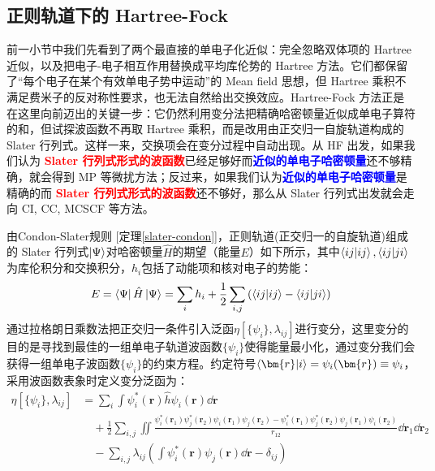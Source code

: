 \subsection{正则轨道下的 Hartree-Fock}\label{sec:hf}
前一小节中我们先看到了两个最直接的单电子化近似：完全忽略双体项的 Hartree 近似，以及把电子-电子相互作用替换成平均库伦势的 Hartree 方法。它们都保留了“每个电子在某个有效单电子势中运动”的 Mean field 思想，但 Hartree 乘积不满足费米子的反对称性要求，也无法自然给出交换效应。Hartree-Fock 方法正是在这里向前迈出的关键一步：它仍然利用变分法把精确哈密顿量近似成单电子算符的和，但试探波函数不再取 Hartree 乘积，而是改用由正交归一自旋轨道构成的 Slater 行列式。这样一来，交换项会在变分过程中自动出现。从 HF 出发，如果我们认为\textcolor{red}{\textbf{ Slater 行列式形式的波函数}}已经足够好而\textcolor{blue}{\textbf{近似的单电子哈密顿量}}还不够精确，就会得到 MP 等微扰方法；反过来，如果我们认为\textcolor{blue}{\textbf{近似的单电子哈密顿量}}是精确的而\textcolor{red}{\textbf{ Slater 行列式形式的波函数}}还不够好，那么从 Slater 行列式出发就会走向 CI, CC, MCSCF 等方法。

由Condon-Slater规则 [定理\ref{slater-condon}]，正则轨道(正交归一的自旋轨道)组成的 Slater 行列式$\ket{\Psi}$对哈密顿量$\hat{H}$的期望（能量$E$）如下所示，其中$\bra{ij}\ket{ij},\bra{ij}\ket{ji}$为库伦积分和交换积分，$h_i$包括了动能项和核对电子的势能：
\[E=\bra{\Psi}\hat{H}\ket{\Psi}=\sum_ih_i+\frac{1}{2}\sum_{i,j}\left(\bra{ij}\ket{ij}-\bra{ij}\ket{ji}\right)\]
通过拉格朗日乘数法把正交归一条件引入泛函$\eta[\{\psi_i\},\lambda_{ij}]$进行变分，这里变分的目的是寻找到最佳的一组单电子轨道波函数$\{\psi_i\}$使得能量最小化，通过变分我们会获得一组单电子波函数$\{\psi_i\}$的约束方程。约定符号$\bra{\bm{r}}\ket{i}=\psi_i(\bm{r})\equiv\psi_i$，采用波函数表象时定义变分泛函为：
\begin{equation*}
\begin{aligned}
\eta[\{\psi_i\},\lambda_{ij}]&=\sum_i\int \psi_i^*(\bm{r})\hat{h}\psi_i(\bm{r})\dd{\bm{r}}\\
&\quad+\frac{1}{2}\sum_{i,j}\iint\frac{\psi_i^*(\bm{r}_1)\psi_j^*(\bm{r}_2)\psi_i(\bm{r}_1)\psi_j(\bm{r}_2)-\psi_i^*(\bm{r}_1)\psi_j^*(\bm{r}_2)\psi_j(\bm{r}_1)\psi_i(\bm{r}_2)}{r_{12}}\dd{\bm{r}_1}\dd{\bm{r}_2}\\
&\quad-\sum_{i,j}\lambda_{ij}\left(\int \psi_i^*(\bm{r})\psi_j(\bm{r})\dd{\bm{r}}-\delta_{ij}\right)
\end{aligned}
\end{equation*}

